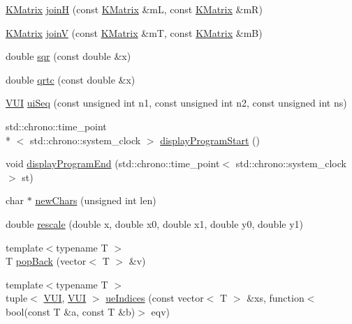 \begin{DoxyCompactItemize}
\item 
\hyperlink{class_k_base_1_1_k_matrix}{K\-Matrix} \hyperlink{namespace_k_base_ad49fdc489f8538844d01c49392634081}{join\-H} (const \hyperlink{class_k_base_1_1_k_matrix}{K\-Matrix} \&m\-L, const \hyperlink{class_k_base_1_1_k_matrix}{K\-Matrix} \&m\-R)
\item 
\hyperlink{class_k_base_1_1_k_matrix}{K\-Matrix} \hyperlink{namespace_k_base_a796ab044ec4f63b9391d2a3989965e1c}{join\-V} (const \hyperlink{class_k_base_1_1_k_matrix}{K\-Matrix} \&m\-T, const \hyperlink{class_k_base_1_1_k_matrix}{K\-Matrix} \&m\-B)
\item 
double \hyperlink{namespace_k_base_a607c35cb43f1585397c32fd47fade103}{sqr} (const double \&x)
\item 
double \hyperlink{namespace_k_base_aff58e584fe9ce53e400c08f797813591}{qrtc} (const double \&x)
\item 
\hyperlink{namespace_k_base_ad8d970208cc99c612b207d7bbbad4434}{V\-U\-I} \hyperlink{namespace_k_base_a01bdf949b6054d843e90d10042322d96}{ui\-Seq} (const unsigned int n1, const unsigned int n2, const unsigned int ns)
\item 
std\-::chrono\-::time\-\_\-point\\*
$<$ std\-::chrono\-::system\-\_\-clock $>$ \hyperlink{namespace_k_base_ab0871faf9fbf11d9beff0474855e243b}{display\-Program\-Start} ()
\item 
void \hyperlink{namespace_k_base_aad5a0bacc5ed657a4a2de3016aed6f80}{display\-Program\-End} (std\-::chrono\-::time\-\_\-point$<$ std\-::chrono\-::system\-\_\-clock $>$ st)
\item 
char $\ast$ \hyperlink{namespace_k_base_a843419e4dec80d9ebf59a2d94f8b82a4}{new\-Chars} (unsigned int len)
\item 
double \hyperlink{namespace_k_base_a7e301a845f68b92c24e79647021f0044}{rescale} (double x, double x0, double x1, double y0, double y1)
\item 
{\footnotesize template$<$typename T $>$ }\\T \hyperlink{namespace_k_base_a0a4af5da8318344e8a67e011a20bed87}{pop\-Back} (vector$<$ T $>$ \&v)
\item 
{\footnotesize template$<$typename T $>$ }\\tuple$<$ \hyperlink{namespace_k_base_ad8d970208cc99c612b207d7bbbad4434}{V\-U\-I}, \hyperlink{namespace_k_base_ad8d970208cc99c612b207d7bbbad4434}{V\-U\-I} $>$ \hyperlink{namespace_k_base_ad1d95e80b1482815cc304e66c3440ae8}{ue\-Indices} (const vector$<$ T $>$ \&xs, function$<$ bool(const T \&a, const T \&b)$>$ eqv)

\end{DoxyCompactItemize}
